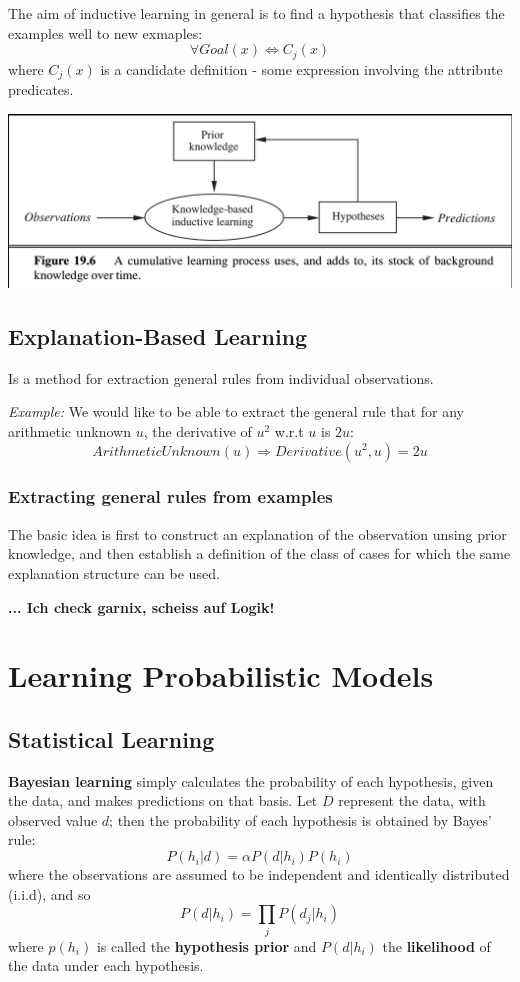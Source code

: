 \documentclass{scrartcl}
\begin{document}
The aim of inductive learning in general is to find a hypothesis that classifies the examples well to new exmaples:
\[\forall Goal(x) \Leftrightarrow C_j(x)\]
where \(C_j(x)\) is a candidate definition - some expression involving the attribute predicates.

\begin{center}
    \includegraphics[scale=0.4]{img/cumlearn.png}
\end{center}

\subsection{Explanation-Based Learning}
Is a method for extraction general rules from individual observations.

\textit{Example:} We would like to be able to extract the general rule that for any arithmetic unknown \(u\), the derivative of \(u^2\) w.r.t \(u\) is \(2u\):
\[ArithmeticUnknown(u) \Rightarrow Derivative(u^2, u) = 2u\]  
\subsubsection{Extracting general rules from examples}
The basic idea is first to construct an explanation of the observation unsing prior knowledge, and then establish a definition of the class of cases for which the same explanation structure can be used.

\textbf{... Ich check garnix, scheiss auf Logik!}

\section{Learning Probabilistic Models}
\subsection{Statistical Learning}
\textbf{Bayesian learning} simply calculates the probability of each hypothesis, given the data, and makes predictions on that basis. Let \(D\) represent the data, with observed value \(d\); then the probability of each hypothesis is obtained by Bayes' rule:
\[P(h_i | d) = \alpha P(d|h_i) P(h_i)\]
where the observations are assumed to be independent and identically distributed (i.i.d), and so
\[P(d | h_i) = \prod_j P(d_j|h_i)\]
where \(p(h_i)\) is called the \textbf{hypothesis prior} and \(P(d|h_i)\) the \textbf{likelihood} of the data under each hypothesis.
\end{document}

